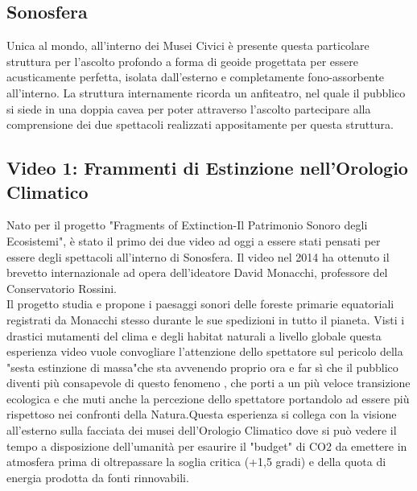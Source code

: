 \documentclass[hidelinks,12pt,a4paper]{article}
\begin{document}
\begin{flushleft}
			\section{Sonosfera}
			Unica al mondo, all'interno dei Musei Civici è presente questa particolare struttura per l'ascolto profondo a forma di geoide progettata per essere acusticamente perfetta, isolata dall'esterno e completamente fono-assorbente all'interno. La struttura internamente ricorda un anfiteatro, nel quale il pubblico si siede in una doppia cavea per poter attraverso l'ascolto partecipare alla comprensione dei due spettacoli realizzati appositamente per questa struttura.
	
			\subsection{Video 1: Frammenti di Estinzione nell'Orologio Climatico}
			Nato per il progetto "Fragments of Extinction-Il Patrimonio Sonoro degli Ecosistemi", è stato il primo dei due video ad oggi a essere stati pensati per essere degli spettacoli all'interno di Sonosfera. Il video nel 2014 ha ottenuto il brevetto internazionale ad opera dell'ideatore David Monacchi, professore del Conservatorio Rossini.\\
			Il progetto studia e propone i paesaggi sonori delle foreste primarie equatoriali registrati da Monacchi stesso durante le sue spedizioni in tutto il pianeta. Visti i drastici mutamenti del clima e degli habitat naturali a livello globale questa esperienza video vuole convogliare l'attenzione dello spettatore sul pericolo della "sesta estinzione di massa"che sta avvenendo proprio ora e far sì che il pubblico diventi più consapevole di questo fenomeno , che porti a un più veloce transizione ecologica e che muti anche la percezione dello spettatore portandolo ad essere più rispettoso nei confronti della Natura.Questa esperienza si collega con la visione all'esterno sulla facciata dei musei dell'Orologio Climatico dove si può vedere il tempo a disposizione dell'umanità per esaurire il "budget" di CO2 da emettere in atmosfera prima di oltrepassare la soglia critica (+1,5 gradi) e della quota di energia prodotta da fonti rinnovabili.
	

\end{flushleft}
\end{document}
